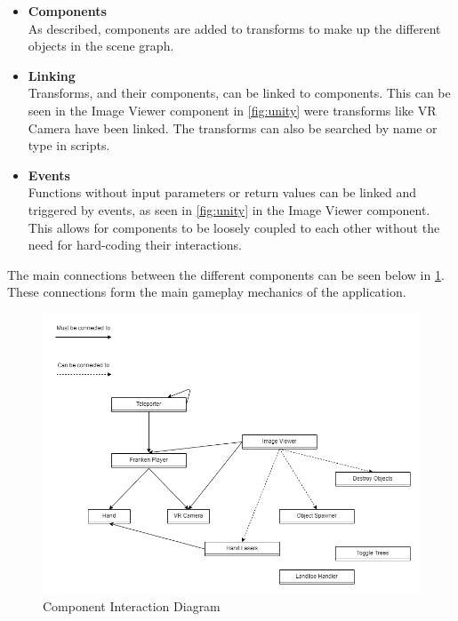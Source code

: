         \begin{itemize}
            \item \textbf{Components} \\
            As described, components are added to transforms to make up the different objects in the scene graph.
            
            \item \textbf{Linking} \\
            Transforms, and their components, can be linked to components. This can be seen in the Image Viewer component in \cref{fig:unity} were transforms like VR Camera have been linked. The transforms can also be searched by name or type in scripts.
            
            \item \textbf{Events} \\
            Functions without input parameters or return values can be linked and triggered by events, as seen in \cref{fig:unity} in the Image Viewer component. This allows for components to be loosely coupled to each other without the need for hard-coding their interactions.
        \end{itemize}
        
        The main connections between the different components can be seen below in \cref{fig:component_interaction_diagram}. These connections form the main gameplay mechanics of the application.
        
        \FloatBarrier
        \begin{figure}
            \centering
            \includegraphics[width=\ImageWidth]{figures/component_interaction_diagram.png}
            \caption{Component Interaction Diagram}
            \label{fig:component_interaction_diagram}
        \end{figure}
        \FloatBarrier
        
